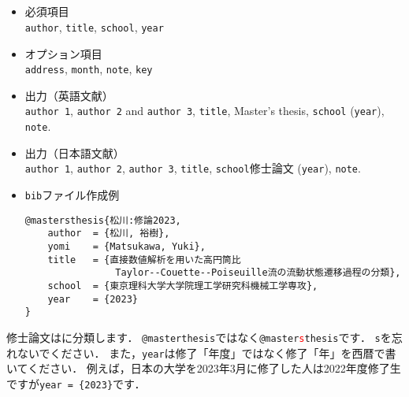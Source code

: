 \documentclass[a4paper,fleqn,uplatex,dvipdfmx]{jsarticle}
\begin{document}
\subsection{\ttmastersthesis}
\label{ssec:mastersthesis}
\begin{screen}
    \begin{itemize}
        \item 必須項目 \\
        \verb|author|, \verb|title|, \verb|school|, \verb|year|
        \item オプション項目 \\
        \verb|address|, \verb|month|, \verb|note|, \verb|key|
        \item 出力（英語文献） \\
            \colorbox[gray]{0.8}{\texttt{author 1}}, \colorbox[gray]{0.8}{\texttt{author 2}} and \colorbox[gray]{0.8}{\texttt{author 3}}, \colorbox[gray]{0.8}{\texttt{title}}, Master's thesis, \colorbox[gray]{0.8}{\texttt{school}} (\colorbox[gray]{0.8}{\texttt{year}}), \colorbox[gray]{0.8}{\texttt{note}}.
        \item 出力（日本語文献） \\
            \colorbox[gray]{0.8}{\texttt{author 1}}, \colorbox[gray]{0.8}{\texttt{author 2}}, \colorbox[gray]{0.8}{\texttt{author 3}}, \colorbox[gray]{0.8}{\texttt{title}}, \colorbox[gray]{0.8}{\texttt{school}}修士論文 (\colorbox[gray]{0.8}{\texttt{year}}), \colorbox[gray]{0.8}{\texttt{note}}.
        \item \verb|bib|ファイル作成例 \vspace{-3mm}
\begin{verbatim}
@mastersthesis{松川:修論2023,
    author  = {松川, 裕樹},
    yomi    = {Matsukawa, Yuki},
    title   = {直接数値解析を用いた高円筒比
                Taylor--Couette--Poiseuille流の流動状態遷移過程の分類},
    school  = {東京理科大学大学院理工学研究科機械工学専攻},
    year    = {2023}
}
\end{verbatim}
    \end{itemize}
\end{screen}

修士論文は\ttmastersthesis に分類します．
\verb|@masterthesis|ではなく\texttt{@master\textcolor{red}{s}thesis}です．
\verb|s|を忘れないでください．
また，\verb|year|は修了「年度」ではなく修了「年」を西暦で書いてください．
例えば，日本の大学を2023年3月に修了した人は2022年度修了生ですが\verb|year = {2023}|です．
\end{document}
